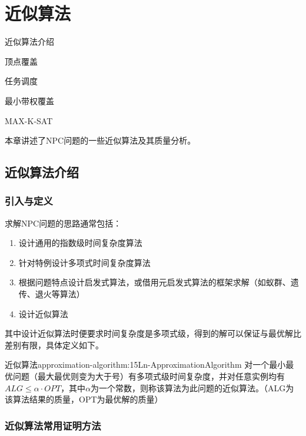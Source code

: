 \chapter{近似算法}
\raggedright%
\begin{introduction}
	\item 近似算法介绍
	\item 顶点覆盖
	\item 任务调度
	\item 最小带权覆盖
	\item MAX-K-SAT
\end{introduction}

本章讲述了NPC问题的一些近似算法及其质量分析。

\section{近似算法介绍}

\subsection{引入与定义}

求解NPC问题的思路通常包括：
\begin{enumerate}
	\item 设计通用的指数级时间复杂度算法
	\item 针对特例设计多项式时间复杂度算法
	\item 根据问题特点设计启发式算法，或借用元启发式算法的框架求解（如蚁群、遗传、退火等算法）
	\item 设计近似算法
\end{enumerate}
其中设计近似算法时便要求时间复杂度是多项式级，得到的解可以保证与最优解比差别有限，具体定义如下。

\begin{definition}{近似算法}{approximation-algorithm:15Ln-ApproximationAlgorithm}
	对一个最小最优问题（最大最优则变为大于号）有多项式级时间复杂度，并对任意实例均有$ALG\leqslant \alpha \cdot OPT$，其中$\alpha$为一个常数，则称该算法为此问题的近似算法。（ALG为该算法结果的质量，OPT为最优解的质量）
\end{definition}

\subsection{近似算法常用证明方法}

